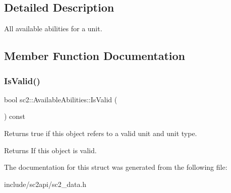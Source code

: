 \subsection{Detailed Description}
All available abilities for a unit. 

\subsection{Member Function Documentation}
\mbox{\label{structsc2_1_1_available_abilities_a9ee95eab5fb81086c452a8790c13c368}} 
\subsubsection{\texorpdfstring{Is\+Valid()}{IsValid()}}
{\footnotesize\ttfamily bool sc2\+::\+Available\+Abilities\+::\+Is\+Valid (\begin{DoxyParamCaption}{ }\end{DoxyParamCaption}) const\hspace{0.3cm}{\ttfamily [inline]}}

Returns true if this object refers to a valid unit and unit type. \begin{DoxyReturn}{Returns}
If this object is valid. 
\end{DoxyReturn}


The documentation for this struct was generated from the following file\+:\begin{DoxyCompactItemize}
\item 
include/sc2api/sc2\+\_\+data.\+h\end{DoxyCompactItemize}
